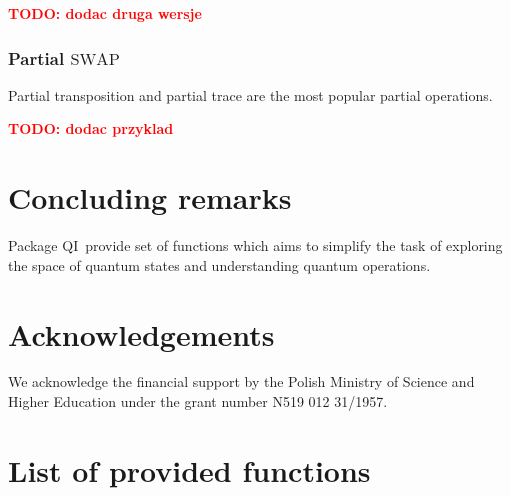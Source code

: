 \documentclass[final,5p,times]{elsarticle}
\newcommand{\1}{{\rm 1\hspace{-0.9mm}l}}
\newcommand{\SWAP}{\ensuremath{\mathrm{SWAP}}}
\newcommand{\qi}{QI}
\newcommand{\todo}[1]{\textcolor{red}{\bf TODO: #1}}
\begin{document}
\todo{dodac druga wersje}

\subsubsection{Partial \SWAP}
Partial transposition and partial trace are the most popular partial operations.

\todo{dodac przyklad}



\section{Concluding remarks}\label{sec:comclude}
Package \qi\ provide set of functions which aims to simplify the task of
exploring the space of quantum states and understanding quantum operations.

\section*{Acknowledgements}
We acknowledge the financial support by the Polish
Ministry of Science and Higher Education under the grant number N519 012
31/1957. 

\appendix
\section{List of provided functions}





\end{document}
